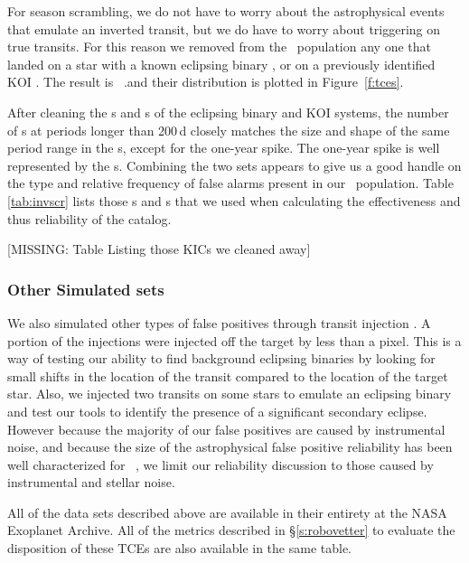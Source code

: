 For season scrambling, we do not have to worry about the astrophysical events that emulate an inverted transit, but we do have to worry about triggering on true transits. For this reason we removed from the \scrtce\ population any one that landed on a star with a known eclipsing binary \citep{Kirk2016}, or on a previously identified KOI \citep{Coughlin2016}.  The result is \nscrtces\ \scrtce.and their distribution is plotted in Figure~\ref{f:tces}. 

After cleaning the \invtce s and \scrtce s of the eclipsing binary and KOI systems, the number of \scrtce s at periods longer than 200\,d closely matches the size and shape of the same period range in the \opstce s, except for the one-year spike.  The one-year spike is well represented by the \invtce s.  Combining the two sets appears to give us a good handle on the type and relative frequency of false alarms present in our \opstce\ population. Table\,\ref{tab:invscr} lists those \invtce s and \scrtce s that we used when calculating the effectiveness and thus reliability of the catalog.


[MISSING: Table Listing those KICs we cleaned away]

\subsubsection{Other Simulated sets}
We also simulated other types of false positives through transit injection \citep{Christiansen2017}. A portion of the injections were injected off the target by less than a pixel.  This is a way of testing our ability to find background eclipsing binaries by looking for small shifts in the location of the transit compared to the location of the target star.  Also, we injected two transits on some stars to emulate an eclipsing binary and test our tools to identify the presence of a significant secondary eclipse.  However because the majority of our false positives are caused by instrumental noise, and because the size of the astrophysical false positive reliability has been well characterized for \Kepler\ \citep[e.g.][]{Morton2016}, we limit our reliability discussion to those caused by instrumental and stellar noise. 


All of the data sets described above are available in their entirety at the NASA Exoplanet Archive.  All of the metrics described in \S\ref{s:robovetter} to evaluate the disposition of these TCEs are also available in the same table. 